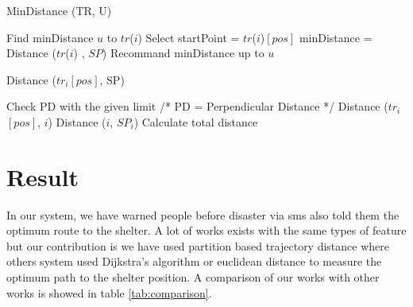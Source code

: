 \documentclass[conference]{IEEEtran}
\begin{document}


\begin{algorithm}
\caption{MinDistance (TR, U)}
\label{alg:mindistance}
\begin{algorithmic}[1]
\State Find minDistance $u$ to $tr$($i$)
\State Select startPoint = $tr$($i$)$[pos]$
\State minDistance = Distance ($tr$($i$) , $SP$)
\EndFor
\EndFor
\State Recommand minDistance up to $u$
\end{algorithmic}
\end{algorithm}



\begin{algorithm}
\caption{Distance ($tr_i$$[pos]$, SP)}
\label{alg:distance}
\begin{algorithmic}[1]
\State Check PD with the given limit /* PD = Perpendicular Distance */ 
\State Distance ($tr_i$$[pos]$, $i$)
\State Distance ($i$, $SP_i$)
\EndFor
\State Calculate total distance
\EndFor
\end{algorithmic}
\end{algorithm}




\section {Result}
\label{result}

In our system, we have warned people before disaster via sms also told them the optimum route to the shelter. A lot of works exists with the same types of feature but our contribution is we have used partition based trajectory distance where others system used Dijkstra's algorithm or euclidean distance to measure the optimum path to the shelter position. A comparison of our works with other works is showed in table \ref{tab:comparison}.
\end{document}
